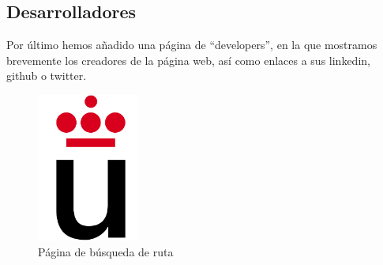 \documentclass[11pt,a4paper]{article}
\begin{document}
\subsection{Desarrolladores}
Por último hemos añadido una página de ``developers'', en la que mostramos brevemente los creadores de la página web, así como enlaces a sus linkedin, github o twitter.
\begin{figure}[h]
\centering
  \includegraphics[width=0.3\textwidth]{./imagenes/logoURJC}
  \caption{Página de búsqueda de ruta}
  \label{fig: Página de búsqueda de developers}
\end{figure}
\end{document}

